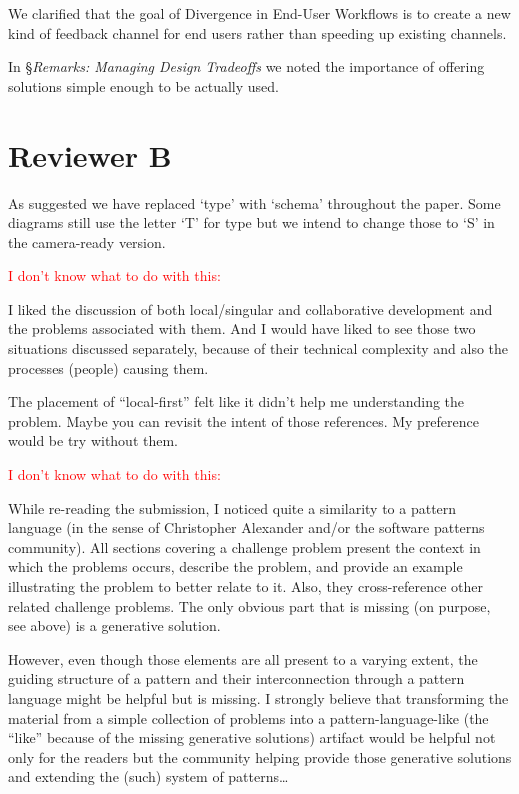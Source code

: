 \documentclass{article}
\begin{document}
We clarified that the goal of Divergence in End-User Workflows is to create a new kind of feedback channel for end users rather than speeding up existing channels.

In \S\emph{Remarks: Managing Design Tradeoffs} we noted the importance of offering solutions simple enough to be actually used.

\section{Reviewer B}

As suggested we have replaced `type' with `schema' throughout the paper. Some diagrams still use the letter `T' for type but we intend to change those to `S' in the camera-ready version.

\textcolor{red}{I don't know what to do with this:}
\begin{displayquote}
I liked the discussion of both local/singular and collaborative development and the problems associated with them. And I would have liked to see those two situations discussed separately, because of their technical complexity and also the processes (people) causing them.

The placement of “local-first” felt like it didn’t help me understanding the problem. Maybe you can revisit the intent of those references. My preference would be try without them.
\end{displayquote}

\textcolor{red}{I don't know what to do with this:}
\begin{displayquote}
  While re-reading the submission, I noticed quite a similarity to a pattern language (in the sense of Christopher Alexander and/or the software patterns community). All sections covering a challenge problem present the context in which the problems occurs, describe the problem, and provide an example illustrating the problem to better relate to it. Also, they cross-reference other related challenge problems. The only obvious part that is missing (on purpose, see above) is a generative solution.

  However, even though those elements are all present to a varying extent, the guiding structure of a pattern and their interconnection through a pattern language might be helpful but is missing. I strongly believe that transforming the material from a simple collection of problems into a pattern-language-like (the “like” because of the missing generative solutions) artifact would be helpful not only for the readers but the community helping provide those generative solutions and extending the (such) system of patterns…
\end{displayquote}
\end{document}
